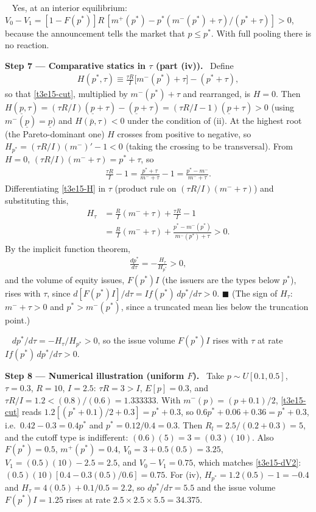 \documentclass[11pt,a4paper]{article}
\newcommand{\step}[2]{\par\medskip\noindent\textbf{Step #1 --- #2.}~}
\newcommand{\answer}[1]{\par\smallskip\noindent\fbox{\textbf{Answer #1.}}~}
\begin{document}
\answer{(iii)} Yes, at an interior equilibrium: $V_0-V_1=[1-F(p^*)]R\,[m^+(p^*)-p^*(m^-(p^*)+\tau)/(p^*+\tau)]>0$, because the announcement tells the market that $p\le p^*$. With full pooling there is no reaction.

\step{7}{Comparative statics in $\tau$ (part (iv))} Define
\begin{align}
  H(p^*,\tau) \equiv \frac{\tau R}{I}\bigl[m^-(p^*)+\tau\bigr]-(p^*+\tau), \label{t3e15-H}
\end{align}
so that \eqref{t3e15-cut}, multiplied by $m^-(p^*)+\tau$ and rearranged, is $H=0$. Then $H(\underline p,\tau)=(\tau R/I)(\underline p+\tau)-(\underline p+\tau)=(\tau R/I-1)(\underline p+\tau)>0$ (using $m^-(\underline p)=\underline p$) and
$H(\bar p,\tau)<0$ under the condition of (ii). At the highest root (the Pareto-dominant one) $H$ crosses
from positive to negative, so $H_{p^*}=(\tau R/I)(m^-)'-1<0$ (taking the crossing to be transversal).
From $H=0$, $(\tau R/I)(m^-+\tau)=p^*+\tau$, so
\begin{align}
  \frac{\tau R}{I}-1 = \frac{p^*+\tau}{m^-+\tau}-1 = \frac{p^*-m^-}{m^-+\tau}. \nonumber
\end{align}
Differentiating \eqref{t3e15-H} in $\tau$ (product rule on $(\tau R/I)(m^-+\tau)$) and substituting this,
\begin{align}
  H_\tau &= \frac RI(m^-+\tau)+\frac{\tau R}{I}-1 \nonumber\\
         &= \frac RI(m^-+\tau)+\frac{p^*-m^-(p^*)}{m^-(p^*)+\tau} > 0. \label{t3e15-Ht}
\end{align}
By the implicit function theorem,
\begin{align}
  \frac{dp^*}{d\tau} = -\frac{H_\tau}{H_{p^*}} > 0, \label{t3e15-dp}
\end{align}
and the volume of equity issues, $F(p^*)I$ (the issuers are the types below $p^*$), rises with $\tau$, since
$d[F(p^*)I]/d\tau=If(p^*)\,dp^*/d\tau>0$. $\blacksquare$ (The sign of $H_\tau$: $m^-+\tau>0$ and $p^*>m^-(p^*)$, since a truncated mean lies below the truncation point.)

\answer{(iv)} $dp^*/d\tau=-H_\tau/H_{p^*}>0$, so the issue volume $F(p^*)I$ rises with $\tau$ at rate $If(p^*)\,dp^*/d\tau>0$.

\step{8}{Numerical illustration (uniform $F$)} Take $p\sim U[0.1,0.5]$, $\tau=0.3$, $R=10$, $I=2.5$:
$\tau R=3>I$, $E[p]=0.3$, and $\tau R/I=1.2<(0.8)/(0.6)=1.333333$. With $m^-(p)=(p+0.1)/2$,
\eqref{t3e15-cut} reads $1.2[(p^*+0.1)/2+0.3]=p^*+0.3$, so $0.6p^*+0.06+0.36=p^*+0.3$, i.e.\ $0.42-0.3=0.4p^*$ and $p^*=0.12/0.4=0.3$. Then
$R_l=2.5/(0.2+0.3)=5$, and the cutoff type is indifferent: $(0.6)(5)=3=(0.3)(10)$. Also $F(p^*)=0.5$,
$m^+(p^*)=0.4$, $V_0=3+0.5(0.5)=3.25$, $V_1=(0.5)(10)-2.5=2.5$, and $V_0-V_1=0.75$, which matches
\eqref{t3e15-dV2}: $(0.5)(10)[0.4-0.3(0.5)/0.6]=0.75$. For (iv), $H_{p^*}=1.2(0.5)-1=-0.4$ and
$H_\tau=4(0.5)+0.1/0.5=2.2$, so $dp^*/d\tau=5.5$ and the issue volume $F(p^*)I=1.25$ rises at rate
$2.5\times2.5\times5.5=34.375$.
\end{document}
